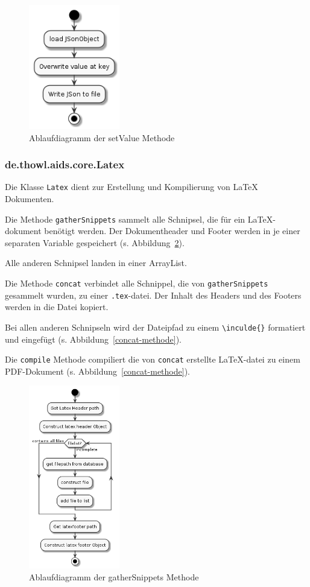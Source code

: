 \documentclass[stu, a4paper, 11pt, floatsintext]{apa7}
\begin{document}
\begin{figure}[!htbp]
\centering
\includegraphics[width=150px]{../technical_documentation/diagramm/uml/flowcharts/core/json/setValue.png}
\caption{\label{setValue-methode}Ablaufdiagramm der setValue Methode}
\end{figure}

\subsubsection{de.thowl.aids.core.Latex}
\noindent  Die Klasse \texttt{Latex} dient zur Erstellung und Kompilierung von \LaTeX{} Dokumenten.

Die Methode \texttt{gatherSnippets} sammelt alle Schnipsel, die für ein \LaTeX{}-dokument benötigt werden.
Der Dokumentheader und Footer werden in je einer separaten Variable gespeichert (s. Abbildung~\ref{gatherSnippets-methode}).

Alle anderen Schnipsel landen in einer ArrayList.

Die Methode \texttt{concat} verbindet alle Schnippel, die von \texttt{gatherSnippets} gesammelt wurden, zu einer \texttt{.tex}-datei.
Der Inhalt des Headers und des Footers werden in die Datei kopiert.

Bei allen anderen Schnipseln wird der Dateipfad zu einem \texttt{\textbackslash{}inculde\{\}}
formatiert und eingefügt (s. Abbildung~\ref{concat-methode}).

Die \texttt{compile} Methode compiliert die von \texttt{concat} erstellte \LaTeX{}-datei zu einem PDF-Dokument (s. Abbildung~\ref{concat-methode}).

\begin{figure}[!htbp]
\centering
\includegraphics[width=150px]{../technical_documentation/diagramm/uml/flowcharts/core/latex/gatherSnippets.png}
\caption{\label{gatherSnippets-methode}Ablaufdiagramm der gatherSnippets Methode}
\end{figure}
\end{document}
